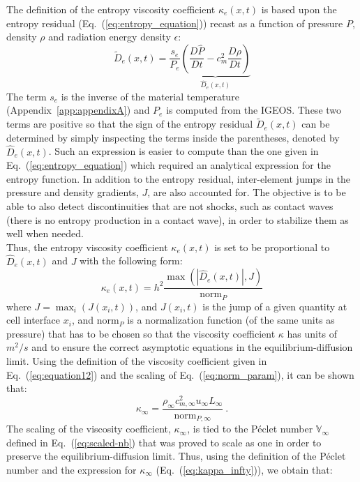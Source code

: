 \documentclass[review]{elsarticle}
\newcommand{\eqt}[1]{Eq.~(\ref{#1})}                     %
\newcommand{\app}[1]{Appendix~\ref{#1}}                     %
\newcommand{\norm}{\textrm{norm}}
\newcommand{\Pe}{\textrm{P\'e}}
\renewcommand{\Pe}{\mathbb{V}_\infty}
\begin{document}
\noindent 
The definition of the entropy viscosity coefficient $\kappa_e(x,t)$ is based upon the entropy residual (\eqt{eq:entropy_equation}) recast as a function of pressure $P$, density $\rho$ and radiation energy density $\epsilon$:
\begin{equation}
\label{eq:equation9}
\tilde{D}_e(x,t) = \frac{s_e}{P_e} \underbrace{ \left( \frac{D\hat{P}}{Dt} - c_m^2 \frac{D\rho}{Dt} \right)}_\textrm{$\hat{D}_e(x,t)$}
\end{equation}
The term $s_e$ is the inverse of the material temperature (\app{app:appendixA}) and $P_e$ is computed from the IGEOS. These two terms are positive so that the sign of the entropy residual $\tilde{D}_e(x,t)$ can be determined by simply inspecting the terms inside the parentheses, denoted by $\hat{D}_e(x,t)$. Such an expression is easier to compute than the one given in \eqt{eq:entropy_equation} which required an analytical expression for the entropy function. In addition to the entropy residual, inter-element jumps in the pressure and density gradients, $J$, are also accounted for. The objective is to be able to also detect discontinuities that are not shocks, such as contact waves (there is no entropy production in a contact wave), in order to stabilize them as well when needed. \\
Thus, the entropy viscosity coefficient $\kappa_e(x,t)$ is set to be proportional to $\hat{D}_e(x,t)$ and $J$ with the following form: 
\begin{equation}
\label{eq:equation12}
\kappa_e(x,t) = h^2 \frac{\max (|\hat{D}_e(x,t)|, J)}{\norm_P}
\end{equation} 
where $J = \max_i (J(x_i,t))$, and $J(x_i,t)$ is the jump of a given quantity at cell interface $x_i$, and $\norm_P$ is a normalization function (of the same units as pressure) that has to be chosen so that the viscosity coefficient $\kappa$ has units of $m^2/s$ and to ensure the correct asymptotic equations in the equilibrium-diffusion limit. Using the definition of the viscosity coefficient given in \eqt{eq:equation12} and the scaling of \eqt{eq:norm_param}, it can be shown that:
%
\begin{equation}\label{eq:kappa_infty}
\kappa_\infty = \frac{\rho_\infty c^2_{m,\infty} u_\infty L_\infty}{\norm_{P,\infty}} \ .
\end{equation}
%
The scaling of the viscosity coefficient, $\kappa_\infty$, is tied to the P\'eclet number $\Pe$ defined in \eqt{eq:scaled-nb} that was proved to scale as one in order to preserve the equilibrium-diffusion limit. Thus, using the definition of the P\'eclet number and the expression for $\kappa_\infty$ (\eqt{eq:kappa_infty}), we obtain that:
\end{document}
